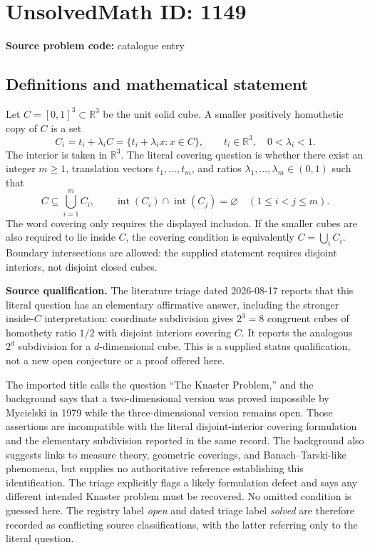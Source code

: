 \documentclass[11pt]{article}
\newcommand{\R}{\mathbb{R}}
\begin{document}
\section*{UnsolvedMath ID: 1149}
\textbf{Source problem code:} catalogue entry
\subsection{Definitions and mathematical statement}
Let $C=[0,1]^3\subset\R^3$ be the unit solid cube. A smaller positively homothetic copy of $C$ is a set
\[
 C_i=t_i+\lambda_i C=\{t_i+\lambda_i x:x\in C\},
 \qquad t_i\in\R^3,\quad 0<\lambda_i<1.
\]
The interior is taken in $\R^3$. The literal covering question is whether there exist an integer $m\geq1$, translation vectors $t_1,\ldots,t_m$, and ratios $\lambda_1,\ldots,\lambda_m\in(0,1)$ such that
\[
 C\subseteq\bigcup_{i=1}^{m}C_i,
 \qquad
 \operatorname{int}(C_i)\cap\operatorname{int}(C_j)=\varnothing
 \quad(1\leq i<j\leq m).
\]
The word covering only requires the displayed inclusion. If the smaller cubes are also required to lie inside $C$, the covering condition is equivalently $C=\bigcup_i C_i$. Boundary intersections are allowed: the supplied statement requires disjoint interiors, not disjoint closed cubes.

\textbf{Source qualification.} The literature triage dated 2026-08-17 reports that this literal question has an elementary affirmative answer, including the stronger inside-$C$ interpretation: coordinate subdivision gives $2^3=8$ congruent cubes of homothety ratio $1/2$ with disjoint interiors covering $C$. It reports the analogous $2^d$ subdivision for a $d$-dimensional cube. This is a supplied status qualification, not a new open conjecture or a proof offered here.

The imported title calls the question ``The Knaster Problem,'' and the background says that a two-dimensional version was proved impossible by Mycielski in 1979 while the three-dimensional version remains open. Those assertions are incompatible with the literal disjoint-interior covering formulation and the elementary subdivision reported in the same record. The background also suggests links to measure theory, geometric coverings, and Banach--Tarski-like phenomena, but supplies no authoritative reference establishing this identification. The triage explicitly flags a likely formulation defect and says any different intended Knaster problem must be recovered. No omitted condition is guessed here. The registry label \emph{open} and dated triage label \emph{solved} are therefore recorded as conflicting source classifications, with the latter referring only to the literal question.
\end{document}
